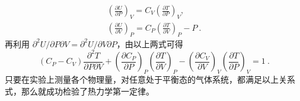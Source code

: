 \begin{align}
\left(\frac{\partial U}{\partial P}\right)_V=C_V\left(\frac{\partial T}{\partial P}\right)_V,\\ 
\left(\frac{\partial U}{\partial V}\right)_P=C_P\left(\frac{\partial T}{\partial V}\right)_P-P~.
\end{align}
再利用 $\partial^2 U/\partial P\partial V=\partial^2 U/\partial V\partial P$，由以上两式可得
\begin{equation}
(C_P-C_V)\frac{\partial^2T}{\partial P\partial V}+\left(\frac{\partial C_P}{\partial P}\right)_P\left(\frac{\partial T}{\partial V}\right)_P-\left(\frac{\partial C_V}{\partial V}\right)_V\left(\frac{\partial T}{\partial P}\right)_V=1~.
\end{equation}
只要在实验上测量各个物理量，对任意处于平衡态的气体系统，都满足以上关系式，那么就成功检验了热力学第一定律。
